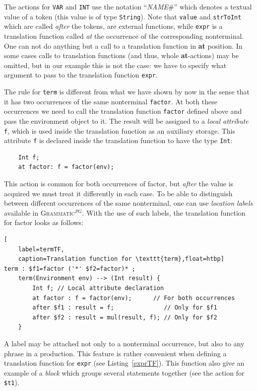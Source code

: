 \documentclass{llncs2e/llncs}
\newcommand{\lstref}[1]{Listing~\ref{#1}}
\newcommand{\ATF}{\textsc{Grammatic}$^{PG}$}
\begin{document}
The actions for \texttt{VAR} and \texttt{INT} use the notation ``\emph{NAME}\#'' which denotes a textual value of a token (this value is of type \texttt{String}). Note that \texttt{value} and \texttt{strToInt} which are called \emph{after} the tokens, are external functions, while \texttt{expr} is a translation function called \emph{at} the occurrence of the corresponding nonterminal. One can not do anything but a call to a translation function in \textbf{at} position. In some cases calls to translation functions (and thus, whole \textbf{at}-actions) may be omitted, but in our example this is not the case: we have to specify what argument to pass to the translation function \texttt{expr}.

The rule for \texttt{term} is different from what we have shown by now in the sense that it has two occurrences of the same nonterminal \texttt{factor}. At both these occurrences we need to call the translation function \texttt{factor} defined above and pass the environment object to it. The result will be assigned to a \emph{local attribute} \texttt{f}, which is used inside the translation function as an auxiliary storage. This attribute \texttt{f} is declared inside the translation function to have the type \texttt{Int}:
\begin{lstlisting}
	Int f;
	at factor: f = factor(env);
\end{lstlisting}
This action is common for both occurrences of factor, but \emph{after} the value is acquired we must treat it differently in each case. To be able to distinguish between different occurrences of the same nonterminal, one can use \emph{location labels} available in \ATF{}. With the use of such labels, the translation function for factor looks as follows:
\begin{lstlisting}[
	label=termTF,
	caption=Translation function for \texttt{term},float=htbp]
term : $f1=factor ('*' $f2=factor)* ;         
	term(Environment env) --> (Int result) {  
		Int f; // Local attribute declaration
		at factor : f = factor(env);      // For both occurrences
		after $f1 : result = f;              // Only for $f1
		after $f2 : result = mul(result, f); // Only for $f2
	}
\end{lstlisting}

A label may be attached not only to a nonterminal occurrence, but also to any phrase in a production. This feature is rather convenient when defining a translation function for \texttt{expr} (see \lstref{exprTF}). This function also give an example of a \emph{block} which groups several statements together (see the action for \texttt{\$t1}).
\end{document}
